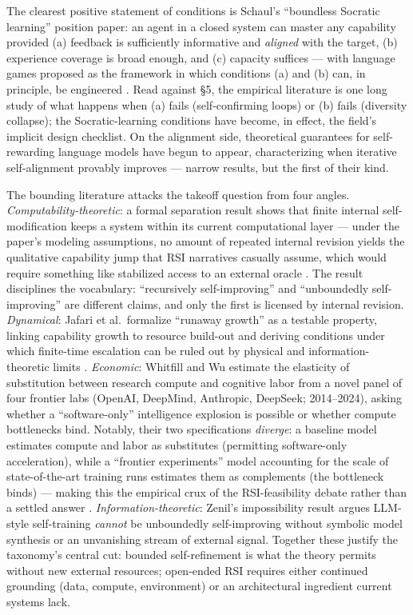 \documentclass[
  11pt,
]{article}
\begin{document}
The clearest positive statement of conditions is Schaul's ``boundless
Socratic learning'' position paper: an agent in a closed system can
master any capability provided (a) feedback is sufficiently informative
and \emph{aligned} with the target, (b) experience coverage is broad
enough, and (c) capacity suffices --- with language games proposed as
the framework in which conditions (a) and (b) can, in principle, be
engineered \citep{schaul2024boundless}. Read against §5, the empirical
literature is one long study of what happens when (a) fails
(self-confirming loops) or (b) fails (diversity collapse); the
Socratic-learning conditions have become, in effect, the field's
implicit design checklist. On the alignment side, theoretical guarantees
for self-rewarding language models have begun to appear, characterizing
when iterative self-alignment provably improves \citep{fu2026self} ---
narrow results, but the first of their kind.

The bounding literature attacks the takeoff question from four angles.
\emph{Computability-theoretic}: a formal separation result shows that
finite internal self-modification keeps a system within its current
computational layer --- under the paper's modeling assumptions, no
amount of repeated internal revision yields the qualitative capability
jump that RSI narratives casually assume, which would require something
like stabilized access to an external oracle
\citep{lu2026computational}. The result disciplines the vocabulary:
``recursively self-improving'' and ``unboundedly self-improving'' are
different claims, and only the first is licensed by internal revision.
\emph{Dynamical}: Jafari et al.~formalize ``runaway growth'' as a
testable property, linking capability growth to resource build-out and
deriving conditions under which finite-time escalation can be ruled out
by physical and information-theoretic limits
\citep{jafari2025mathematical}. \emph{Economic}: Whitfill and Wu
estimate the elasticity of substitution between research compute and
cognitive labor from a novel panel of four frontier labs (OpenAI,
DeepMind, Anthropic, DeepSeek; 2014--2024), asking whether a
``software-only'' intelligence explosion is possible or whether compute
bottlenecks bind. Notably, their two specifications \emph{diverge}: a
baseline model estimates compute and labor as substitutes (permitting
software-only acceleration), while a ``frontier experiments'' model
accounting for the scale of state-of-the-art training runs estimates
them as complements (the bottleneck binds) --- making this the empirical
crux of the RSI-feasibility debate rather than a settled answer
\citep{whitfill2025will}. \emph{Information-theoretic}: Zenil's
impossibility result \citep{zenil2026limits} argues LLM-style
self-training \emph{cannot} be unboundedly self-improving without
symbolic model synthesis or an unvanishing stream of external signal.
Together these justify the taxonomy's central cut: bounded
self-refinement is what the theory permits without new external
resources; open-ended RSI requires either continued grounding (data,
compute, environment) or an architectural ingredient current systems
lack.
\end{document}
